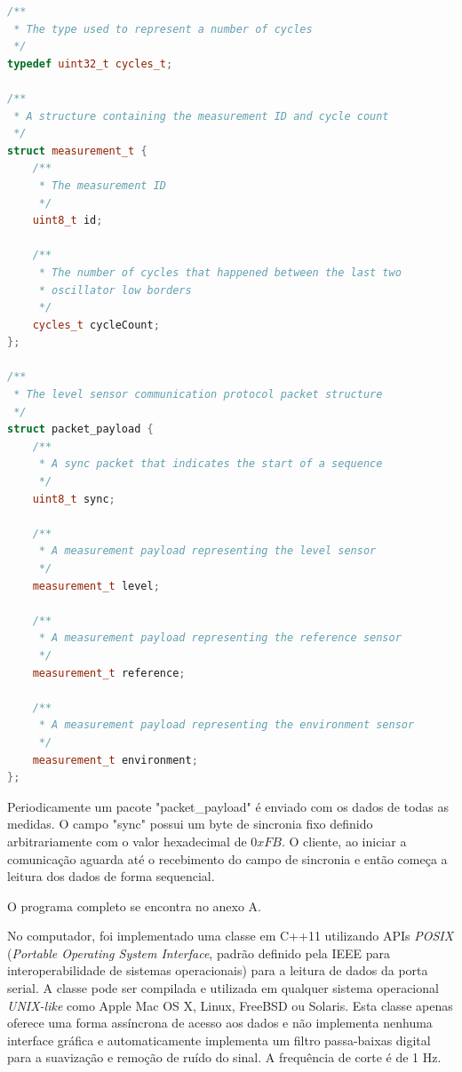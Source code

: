 \documentclass[a4paper]{instrumentacao}
\begin{document}
\begin{lstlisting}[caption=Estrutura dos pacotes de conteúdo enviados pela linha de comunicação serial, language=C++, directivestyle={\color{black}} emph={int,char,double,float,unsigned,uint8_t}, emphstyle={\color{blue}}]
/**
 * The type used to represent a number of cycles
 */
typedef uint32_t cycles_t;

/**
 * A structure containing the measurement ID and cycle count
 */
struct measurement_t {
    /**
     * The measurement ID
     */
    uint8_t id;

    /**
     * The number of cycles that happened between the last two 
     * oscillator low borders
     */
    cycles_t cycleCount;
};

/**
 * The level sensor communication protocol packet structure
 */
struct packet_payload {
    /**
     * A sync packet that indicates the start of a sequence
     */
    uint8_t sync;

    /**
     * A measurement payload representing the level sensor
     */
    measurement_t level;

    /**
     * A measurement payload representing the reference sensor
     */
	measurement_t reference;

    /**
     * A measurement payload representing the environment sensor
     */
    measurement_t environment;
};
\end{lstlisting}

Periodicamente um pacote "packet\_payload" é enviado com os dados de todas as medidas. O campo "sync" possui um byte de sincronia fixo definido arbitrariamente com o valor hexadecimal de $0xFB$. O cliente, ao iniciar a comunicação aguarda até o recebimento do campo de sincronia e então começa a leitura dos dados de forma sequencial.

O programa completo se encontra no anexo A.

No computador, foi implementado uma classe em C++11 utilizando APIs \textit{POSIX} (\textit{Portable Operating System Interface}, padrão definido pela IEEE para interoperabilidade de sistemas operacionais) para a leitura de dados da porta serial. A classe pode ser compilada e utilizada em qualquer sistema operacional \textit{UNIX-like} como Apple Mac OS X, Linux, FreeBSD ou Solaris. Esta classe apenas oferece uma forma assíncrona de acesso aos dados e não implementa nenhuma interface gráfica e automaticamente implementa um filtro passa-baixas digital para a suavização e remoção de ruído do sinal. A frequência de corte é de 1 Hz.
\end{document}
